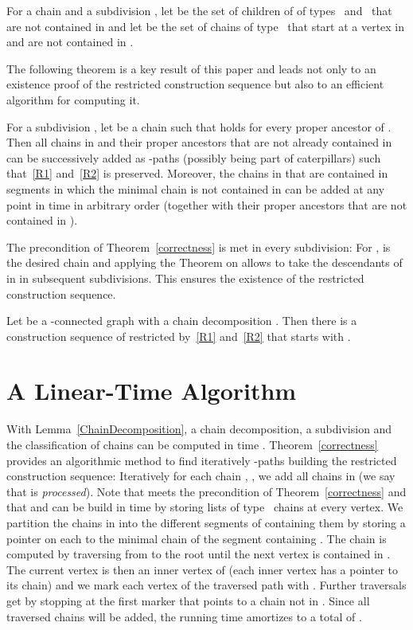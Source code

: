 \begin{definition}
For a chain  and a subdivision , let  be the set of children of  of types~ and~ that are not contained in  and let  be the set of chains of type~ that start at a vertex in  and are not contained in .
\end{definition}

The following theorem is a key result of this paper and leads not only to an existence proof of the restricted construction sequence but also to an efficient algorithm for computing it.

\begin{theorem}\label{correctness}
For a subdivision , let  be a chain such that  holds for every proper ancestor  of . Then all chains in  and their proper ancestors that are not already contained in  can be successively added as \BG-paths (possibly being part of caterpillars) such that~\ref{R1} and~\ref{R2} is preserved. Moreover, the chains in  that are contained in segments in which the minimal chain is not contained in  can be added at any point in time in arbitrary order (together with their proper ancestors that are not contained in ).
\end{theorem}


The precondition of Theorem~\ref{correctness} is met in every subdivision: For ,  is the desired chain and applying the Theorem on  allows to take the descendants of  in  in subsequent subdivisions. This ensures the existence of the restricted construction sequence.

\begin{corollary}\label{correctnessCorollary}
Let  be a -connected graph with a chain decomposition . Then there is a construction sequence of  restricted by~\ref{R1} and~\ref{R2} that starts with .
\end{corollary}




\section{A Linear-Time Algorithm}\label{algorithm}
With Lemma~\ref{ChainDecomposition}, a chain decomposition, a subdivision  and the classification of chains can be computed in time . Theorem~\ref{correctness} provides an algorithmic method to find iteratively \BG-paths building the restricted construction sequence: Iteratively for each chain , , we add all chains in  (we say that  is \emph{processed}). Note that  meets the precondition of Theorem~\ref{correctness} and that  and  can be build in time  by storing lists of type~ chains at every vertex. We partition the chains in  into the different segments of  containing them by storing a pointer on each  to the minimal chain  of the segment containing . The chain  is computed by traversing  from  to the root until the next vertex is contained in . The current vertex is then an inner vertex of  (each inner vertex has a pointer to its chain) and we mark each vertex of the traversed path with . Further traversals get  by stopping at the first marker that points to a chain not in . Since all traversed chains will be added, the running time amortizes to a total of .

